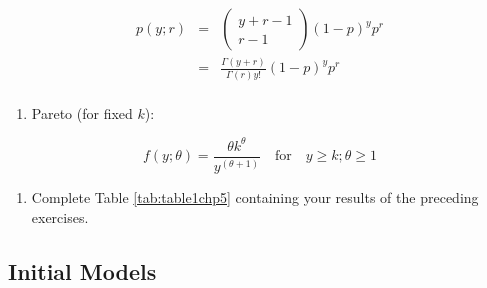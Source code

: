 \documentclass[
]{krantz}
\providecommand{\tightlist}{%
  \setlength{\itemsep}{0pt}\setlength{\parskip}{0pt}}
\begin{document}
\begin{eqnarray}
p(y; r) & = & \left(\begin{array} {c}  y+r-1\\r-1  \end{array}\right)(1-p)^{y}p^r \nonumber \\
 & = & \frac{\Gamma(y+r)}{\Gamma(r)y!} (1-p)^{y}p^r  \\
\end{eqnarray}

\begin{enumerate}
\def\labelenumi{\alph{enumi})}
\setcounter{enumi}{9}
\tightlist
\item
  Pareto (for fixed \(k\)):
\end{enumerate}

\[f(y; \theta)=\frac{\theta k^\theta}{y^{(\theta+1)}}\quad \textrm{for}\quad y\geq k; \theta \geq 1\]

\begin{enumerate}
\def\labelenumi{\arabic{enumi}.}
\setcounter{enumi}{1}
\tightlist
\item
  Complete Table \ref{tab:table1chp5} containing your results of the preceding exercises.
\end{enumerate}

\hypertarget{initial-models-1}{%
\subsection{Initial Models}\label{initial-models-1}}

  
\end{document}
